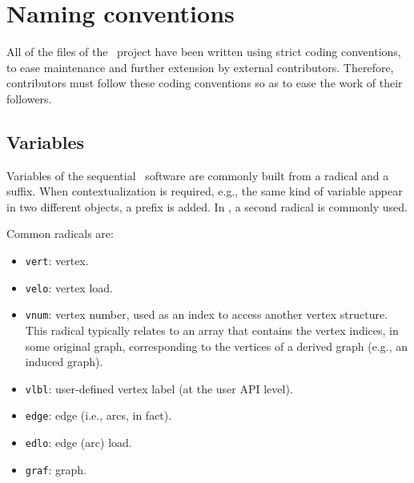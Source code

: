 
\section{Naming conventions}
\label{sec-naming}

All of the files of the \scotch\ project have been written using
strict coding conventions, to ease maintenance and further extension
by external contributors. Therefore, contributors must follow these
coding conventions so as to ease the work of their followers.

\subsection{Variables}
\label{sec-naming-variables}

Variables of the sequential \scotch\ software are commonly built from
a radical and a suffix. When contextualization is required, e.g., the
same kind of variable appear in two different objects, a prefix is
added. In \ptscotch, a second radical is commonly used.

Common radicals are:
\begin{itemize}
\item
\texttt{vert}: vertex.
\item
\texttt{velo}: vertex load.
\item
\texttt{vnum}: vertex number, used as an index to access another vertex
structure. This radical typically relates to an array that contains
the vertex indices, in some original graph, corresponding to the
vertices of a derived graph (e.g., an induced graph).
\item
\texttt{vlbl}: user-defined vertex label (at the user API level).
\item
\texttt{edge}: edge (i.e., arcs, in fact).
\item
\texttt{edlo}: edge (arc) load.
\item
\texttt{graf}: graph.
\end{itemize}

